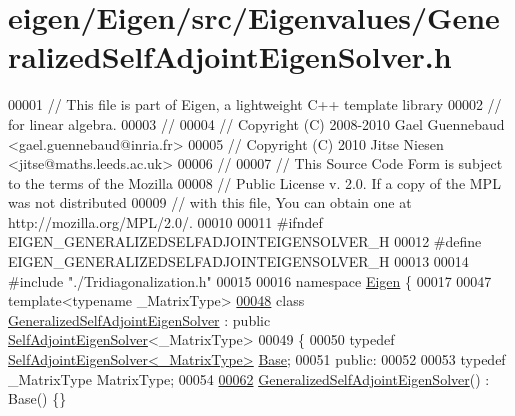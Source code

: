 \hypertarget{eigen_2_eigen_2src_2_eigenvalues_2_generalized_self_adjoint_eigen_solver_8h_source}{}\section{eigen/\+Eigen/src/\+Eigenvalues/\+Generalized\+Self\+Adjoint\+Eigen\+Solver.h}
\label{eigen_2_eigen_2src_2_eigenvalues_2_generalized_self_adjoint_eigen_solver_8h_source}

\begin{DoxyCode}
00001 \textcolor{comment}{// This file is part of Eigen, a lightweight C++ template library}
00002 \textcolor{comment}{// for linear algebra.}
00003 \textcolor{comment}{//}
00004 \textcolor{comment}{// Copyright (C) 2008-2010 Gael Guennebaud <gael.guennebaud@inria.fr>}
00005 \textcolor{comment}{// Copyright (C) 2010 Jitse Niesen <jitse@maths.leeds.ac.uk>}
00006 \textcolor{comment}{//}
00007 \textcolor{comment}{// This Source Code Form is subject to the terms of the Mozilla}
00008 \textcolor{comment}{// Public License v. 2.0. If a copy of the MPL was not distributed}
00009 \textcolor{comment}{// with this file, You can obtain one at http://mozilla.org/MPL/2.0/.}
00010 
00011 \textcolor{preprocessor}{#ifndef EIGEN\_GENERALIZEDSELFADJOINTEIGENSOLVER\_H}
00012 \textcolor{preprocessor}{#define EIGEN\_GENERALIZEDSELFADJOINTEIGENSOLVER\_H}
00013 
00014 \textcolor{preprocessor}{#include "./Tridiagonalization.h"}
00015 
00016 \textcolor{keyword}{namespace }\hyperlink{namespace_eigen}{Eigen} \{ 
00017 
00047 \textcolor{keyword}{template}<\textcolor{keyword}{typename} \_MatrixType>
\hyperlink{group___eigenvalues___module}{00048} \textcolor{keyword}{class }\hyperlink{group___eigenvalues___module_class_eigen_1_1_generalized_self_adjoint_eigen_solver}{GeneralizedSelfAdjointEigenSolver} : \textcolor{keyword}{public} 
      \hyperlink{group___eigenvalues___module_class_eigen_1_1_self_adjoint_eigen_solver}{SelfAdjointEigenSolver}<\_MatrixType>
00049 \{
00050     \textcolor{keyword}{typedef} \hyperlink{group___eigenvalues___module_class_eigen_1_1_self_adjoint_eigen_solver}{SelfAdjointEigenSolver<\_MatrixType>} 
      \hyperlink{group___eigenvalues___module_class_eigen_1_1_self_adjoint_eigen_solver}{Base};
00051   \textcolor{keyword}{public}:
00052 
00053     \textcolor{keyword}{typedef} \_MatrixType MatrixType;
00054 
\hyperlink{group___eigenvalues___module_a501effdbf722c0609ea05ff3fd4cc721}{00062}     \hyperlink{group___eigenvalues___module_a501effdbf722c0609ea05ff3fd4cc721}{GeneralizedSelfAdjointEigenSolver}() : Base() \{\}

\end{DoxyCode}
